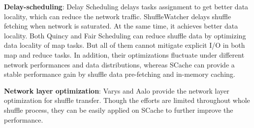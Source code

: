 \textbf{Delay-scheduling}: Delay Scheduling \cite{delay} delays tasks assignment to get better data locality, which can reduce the network traffic. 
ShuffleWatcher \cite{shufflewatcher} delays shuffle fetching when network is saturated. 
At the same time, it achieves better data locality. 
Both Quincy \cite{quincy} and Fair Scheduling \cite{preemptive} can reduce shuffle data by optimizing data locality of map tasks. 
But all of them cannot mitigate explicit I/O in both map and reduce tasks. 
In addition, their optimizations fluctuate under different network performances and data distributions, whereas SCache can provide a stable performance gain by shuffle data pre-fetching and in-memory caching.

\textbf{Network layer optimization}: Varys \cite{varys} and Aalo \cite{aalo} provide the network layer optimization for shuffle transfer. 
Though the efforts are limited throughout whole shuffle process, they can be easily applied on SCache to further improve the performance.